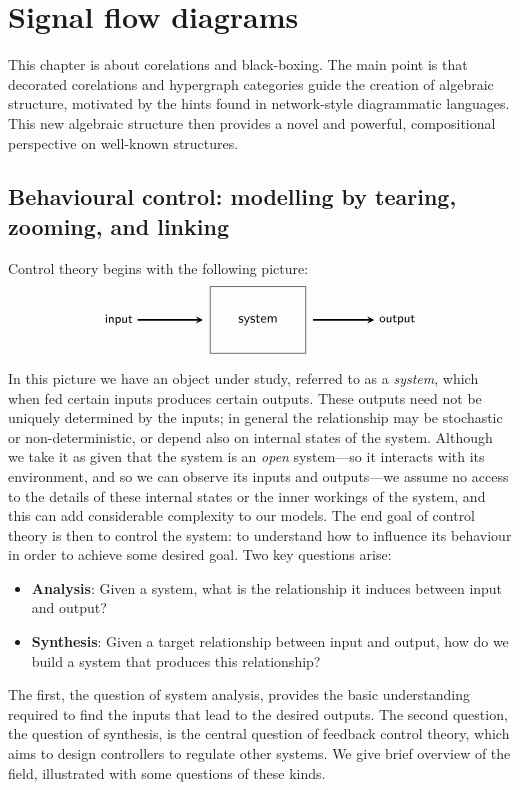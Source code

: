 \chapter{Signal flow diagrams} \label{ch.sigflow}
This chapter is about corelations and black-boxing. The main point is that
decorated corelations and hypergraph categories guide the creation of algebraic
structure, motivated by the hints found in network-style diagrammatic languages.
This new algebraic structure then provides a novel and powerful, compositional
perspective on well-known structures.

\section{Behavioural control: modelling by tearing, zooming, and linking}

Control theory begins with the following picture:		
\[
\begin{tikzpicture}
\node(system) [shape=rectangle,draw,inner sep=20pt] at (0,0) {\textsf{system}};
\node(input) at (-3.5,0) {\small{\textsf{input}}};
\node(output) at (3.5,0) {\small{\textsf{output}}};
\draw [->,shorten >=5pt,>=stealth,very thick] (input) 	-- (system);
\draw [->,shorten <=5pt,>=stealth,very thick] (system)	-- (output);
\end{tikzpicture}
\]
In this picture we have an object under study, referred to as a \emph{system}, which when fed certain inputs produces certain outputs. These outputs need not be uniquely determined by the inputs; in general the relationship may be stochastic or non-deterministic, or depend also on internal states of the system. Although we take it as given that the system is an \emph{open} system---so it interacts with its environment, and so we can observe its inputs and outputs---we assume no access to the details of these internal states or the inner workings of the system, and this can add considerable complexity to our models. The end goal of control theory is then to control the system: to understand how to influence its behaviour in order to achieve some desired goal. Two key questions arise: 
\begin{itemize}
\item \textbf{Analysis}: Given a system, what is the relationship it induces between input and output?
\item \textbf{Synthesis}: Given a target relationship between input and output, how do we build a system that produces this relationship?
\end{itemize}
The first, the question of system analysis, provides the basic understanding required to find the inputs that lead to the desired outputs. The second question, the question of synthesis, is the central question of feedback control theory, which aims to design controllers to regulate other systems. We give brief overview of the field, illustrated with some questions of these kinds.


